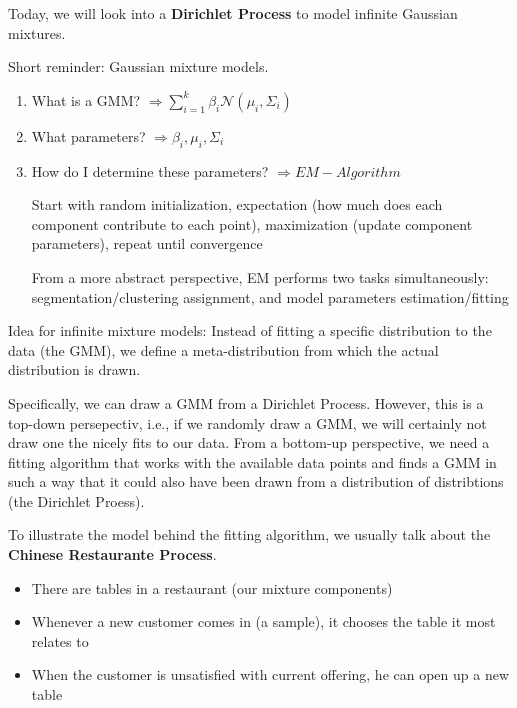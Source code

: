 \documentclass{scrartcl}
\begin{document}
Today, we will look into a \textbf{Dirichlet Process} to model infinite Gaussian mixtures.

\bigbreak

Short reminder: Gaussian mixture models.
\begin{enumerate}
    \item
        What is a GMM? \(\Rightarrow \sum_{i=1}^k \beta_i \mathcal{N}(\mu_i, \Sigma_i)\)
    \item
        What parameters? \(\Rightarrow \beta_i, \mu_i, \Sigma_i\) 
    \item
        How do I determine these parameters? \(\Rightarrow EM-Algorithm\)

        Start with random initialization, expectation (how much does each component contribute to each point), maximization (update component parameters), repeat until convergence

        From a more abstract perspective, EM performs two tasks simultaneously: segmentation/clustering assignment, and model parameters estimation/fitting
\end{enumerate}

\bigbreak

Idea for infinite mixture models: Instead of fitting a specific distribution to the data (the GMM), we define a meta-distribution from which the actual distribution is drawn.

Specifically, we can draw a GMM from a Dirichlet Process. However, this is a top-down persepectiv, i.e., if we randomly draw a GMM, we will certainly not draw one the nicely fits to our data. From a bottom-up perspective, we need a fitting algorithm that works with the available data points and finds a GMM in such a way that it could also have been drawn from a distribution of distribtions (the Dirichlet Proess).

To illustrate the model behind the fitting algorithm, we usually talk about the \textbf{Chinese Restaurante Process}.

\begin{itemize}
    \item
        There are tables in a restaurant (our mixture components)
    \item
        Whenever a new customer comes in (a sample), it chooses the table it most relates to
    \item
        When the customer is unsatisfied with current offering, he can open up a new table
\end{itemize}
\end{document}
